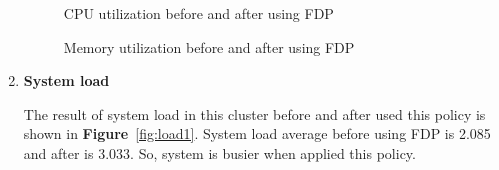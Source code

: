 \documentclass[12pt,oneside,openright,a4paper]{cpe-english-project}
\begin{document}
\begin{enumerate}
\begin{figure}[!h]\centering
    \setlength{\fboxrule}{0mm} %
    \setlength{\fboxsep}{0cm}
    \caption{CPU utilization before and after using FDP}\label{fig:cpu1}
\end{figure}

\begin{figure}[!h]\centering
    \setlength{\fboxrule}{0mm} %
    \setlength{\fboxsep}{0cm}
    \caption{Memory utilization before and after using FDP}\label{fig:mem1}
\end{figure}

  \item \textbf{System load}
  
\hspace{10mm}The result of system load in this cluster before and after used this policy is shown in \textbf{Figure}~\ref{fig:load1}. System load average before using FDP is 2.085 and after is 3.033. So, system is busier when applied this policy.
  

\end{enumerate}
\end{document}
